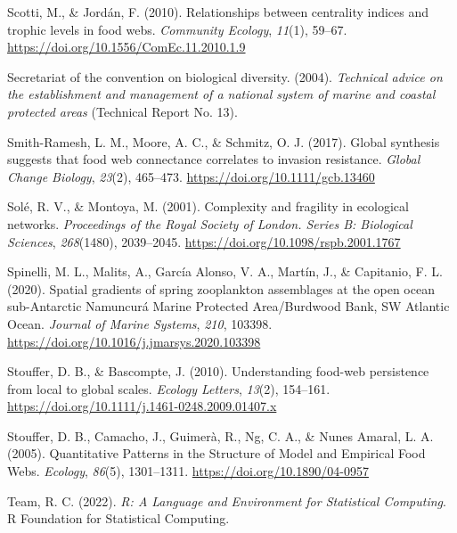 \documentclass[preprint, 3p,
authoryear]{elsarticle} %
\newlength{\cslhangindent}
\newlength{\cslentryspacingunit} %
\newenvironment{CSLReferences}[2] %
 {%
  \setlength{\parindent}{0pt}
  \ifodd #1
  \let\oldpar\par
  \def\par{\hangindent=\cslhangindent\oldpar}
  \fi
  \setlength{\parskip}{#2\cslentryspacingunit}
 }%
 {}
\begin{document}
\begin{CSLReferences}{1}{0}
\leavevmode{}%
Scotti, M., \& Jordán, F. (2010). Relationships between centrality
indices and trophic levels in food webs. \emph{Community Ecology},
\emph{11}(1), 59--67. \url{https://doi.org/10.1556/ComEc.11.2010.1.9}

\leavevmode{}%
Secretariat of the convention on biological diversity. (2004).
\emph{Technical advice on the establishment and management of a national
system of marine and coastal protected areas} (Technical Report No. 13).

\leavevmode{}%
Smith-Ramesh, L. M., Moore, A. C., \& Schmitz, O. J. (2017). Global
synthesis suggests that food web connectance correlates to invasion
resistance. \emph{Global Change Biology}, \emph{23}(2), 465--473.
\url{https://doi.org/10.1111/gcb.13460}

\leavevmode{}%
Solé, R. V., \& Montoya, M. (2001). Complexity and fragility in
ecological networks. \emph{Proceedings of the Royal Society of London.
Series B: Biological Sciences}, \emph{268}(1480), 2039--2045.
\url{https://doi.org/10.1098/rspb.2001.1767}

\leavevmode{}%
Spinelli, M. L., Malits, A., García Alonso, V. A., Martín, J., \&
Capitanio, F. L. (2020). Spatial gradients of spring zooplankton
assemblages at the open ocean sub-{Antarctic Namuncurá Marine Protected
Area}/{Burdwood Bank}, {SW Atlantic Ocean}. \emph{Journal of Marine
Systems}, \emph{210}, 103398.
\url{https://doi.org/10.1016/j.jmarsys.2020.103398}

\leavevmode{}%
Stouffer, D. B., \& Bascompte, J. (2010). Understanding food-web
persistence from local to global scales. \emph{Ecology Letters},
\emph{13}(2), 154--161.
\url{https://doi.org/10.1111/j.1461-0248.2009.01407.x}

\leavevmode{}%
Stouffer, D. B., Camacho, J., Guimerà, R., Ng, C. A., \& Nunes Amaral,
L. A. (2005). Quantitative {Patterns} in the {Structure} of {Model} and
{Empirical Food Webs}. \emph{Ecology}, \emph{86}(5), 1301--1311.
\url{https://doi.org/10.1890/04-0957}

\leavevmode{}%
Team, R. C. (2022). \emph{R: {A Language} and {Environment} for
{Statistical Computing}}. R Foundation for Statistical Computing.


\end{CSLReferences}
\end{document}
